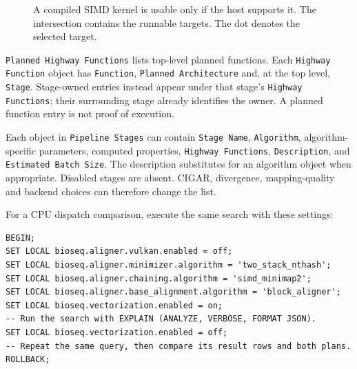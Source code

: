 \begin{figure}[htbp]
\centering
{}
\caption{A compiled SIMD kernel is usable only if the host supports it.
The intersection contains the runnable targets. The dot denotes the
selected target.}
\label{fig:appendix-highway-sets}
\end{figure}

\texttt{Planned Highway Functions} lists top-level planned functions.
Each \texttt{Highway Function} object has \texttt{Function},
\texttt{Planned Architecture} and, at the top level, \texttt{Stage}.
Stage-owned entries instead appear under that stage's
\texttt{Highway Functions}; their surrounding stage already identifies the
owner. A planned function entry is not proof of execution.

Each object in \texttt{Pipeline Stages} can contain
\texttt{Stage Name}, \texttt{Algorithm}, algorithm-specific parameters,
computed properties, \texttt{Highway Functions}, \texttt{Description}, and
\texttt{Estimated Batch Size}. The description substitutes for an algorithm
object when appropriate. Disabled stages are absent. CIGAR, divergence,
mapping-quality and backend choices can therefore change the list.

For a CPU dispatch comparison, execute the same search with these settings:

\par\noindent\begin{minipage}{\linewidth}
\begin{lstlisting}[style=bioseq-appendix-sql]
BEGIN;
SET LOCAL bioseq.aligner.vulkan.enabled = off;
SET LOCAL bioseq.aligner.minimizer.algorithm = 'two_stack_nthash';
SET LOCAL bioseq.aligner.chaining.algorithm = 'simd_minimap2';
SET LOCAL bioseq.aligner.base_alignment.algorithm = 'block_aligner';
SET LOCAL bioseq.vectorization.enabled = on;
-- Run the search with EXPLAIN (ANALYZE, VERBOSE, FORMAT JSON).
SET LOCAL bioseq.vectorization.enabled = off;
-- Repeat the same query, then compare its result rows and both plans.
ROLLBACK;
\end{lstlisting}
\end{minipage}


